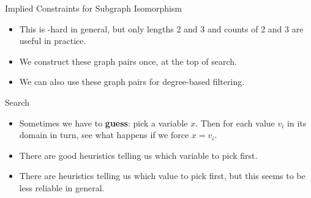 \documentclass{beamer}
\begin{document}
\begin{frame}{Implied Constraints for Subgraph Isomorphism}
{\begin{itemize}
            \item This is \NP-hard in general, but only lengths 2 and 3 and counts of 2 and 3 are
                useful in practice.

            \item We construct these graph pairs once, at the top of search.

            \item We can also use these graph pairs for degree-based filtering.
        \end{itemize}
    }

\end{frame}

\begin{frame}{Search}
    \begin{itemize}
        \item Sometimes we have to \textbf{guess}: pick a variable $x$. Then for each value $v_i$ in
            its domain in turn, see what happens if we force $x = v_i$.
        \item There are good heuristics telling us which variable to pick first.
        \item There are heuristics telling us which value to pick first, but this seems to be
            less reliable in general.
    \end{itemize}
\end{frame}
\end{document}
